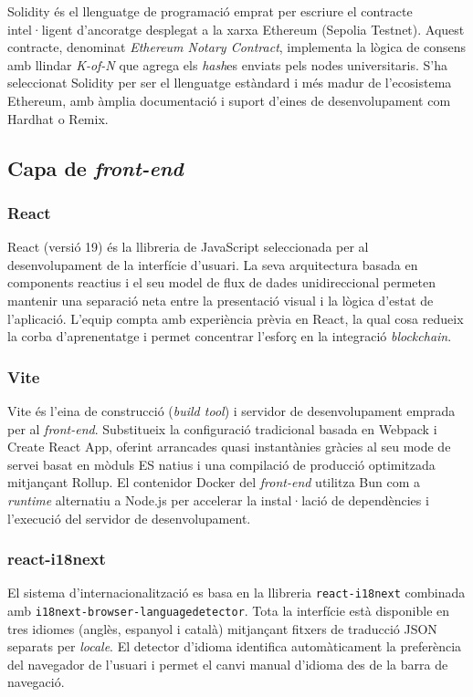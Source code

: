 Solidity és el llenguatge de programació emprat per escriure el contracte intel·ligent d'ancoratge desplegat a la xarxa Ethereum (Sepolia Testnet). Aquest contracte, denominat \textit{Ethereum Notary Contract}, implementa la lògica de consens amb llindar \textit{K-of-N} que agrega els \textit{hash}es enviats pels nodes universitaris. S'ha seleccionat Solidity per ser el llenguatge estàndard i més madur de l'ecosistema Ethereum, amb àmplia documentació i suport d'eines de desenvolupament com Hardhat o Remix.
 
\subsection{Capa de \textit{front-end}}
 
\subsubsection{React}
 
React (versió 19) és la llibreria de JavaScript seleccionada per al desenvolupament de la interfície d'usuari. La seva arquitectura basada en components reactius i el seu model de flux de dades unidireccional permeten mantenir una separació neta entre la presentació visual i la lògica d'estat de l'aplicació. L'equip compta amb experiència prèvia en React, la qual cosa redueix la corba d'aprenentatge i permet concentrar l'esforç en la integració \textit{blockchain}.
 
\subsubsection{Vite}
Vite és l'eina de construcció (\textit{build tool}) i servidor de desenvolupament emprada per al \textit{front-end}. Substitueix la configuració tradicional basada en Webpack i Create React App, oferint arrancades quasi instantànies gràcies al seu mode de servei basat en mòduls ES natius i una compilació de producció optimitzada mitjançant Rollup. El contenidor Docker del \textit{front-end} utilitza Bun com a \textit{runtime} alternatiu a Node.js per accelerar la instal·lació de dependències i l'execució del servidor de desenvolupament.

\subsubsection{react-i18next}
El sistema d'internacionalització es basa en la llibreria \texttt{react-i18next} combinada amb \texttt{i18next-browser-languagedetector}. Tota la interfície està disponible en tres idiomes (anglès, espanyol i català) mitjançant fitxers de traducció JSON separats per \textit{locale}. El detector d'idioma identifica automàticament la preferència del navegador de l'usuari i permet el canvi manual d'idioma des de la barra de navegació.
 
